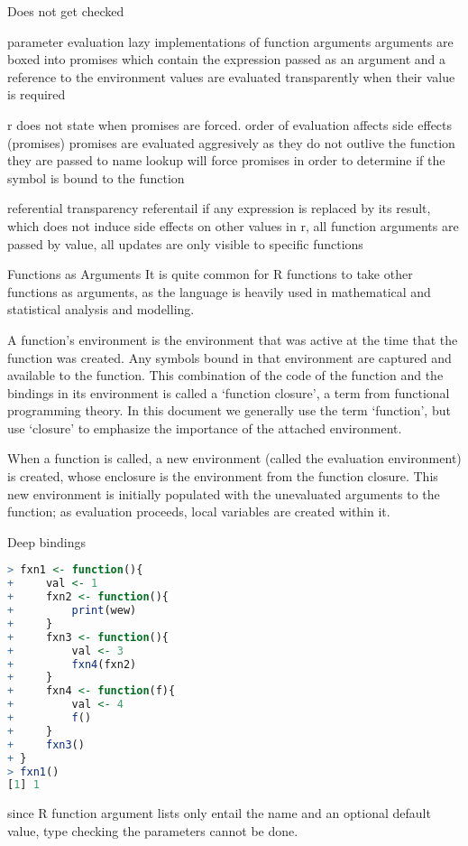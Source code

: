 \documentclass[12pt]{article}
\begin{document}
Does not get  checked

parameter evaluation
lazy implementations of function arguments
arguments are boxed into promises which contain the expression passed as an argument and a reference to the environment
values are evaluated transparently when their value is required

r does not state when promises are forced.
order of evaluation affects side effects (promises)
promises are evaluated aggresively as they do not outlive the function they are passed to
name lookup will force promises in order to determine if the symbol is bound to the function

referential transparency
referentail if any expression is replaced by its result, which does not induce side effects on other values
in r, all function arguments are passed by value, all updates are only visible to specific functions

Functions as Arguments
It is quite common for R functions to take other functions as arguments, as the language is heavily used in mathematical and statistical analysis and modelling.

A function’s environment is the environment that was active at the time that the function was
created. Any symbols bound in that environment are captured and available to the function. This
combination of the code of the function and the bindings in its environment is called a ‘function
closure’, a term from functional programming theory. In this document we generally use the
term ‘function’, but use ‘closure’ to emphasize the importance of the attached environment.

When a function is called, a new environment (called the evaluation environment) is created,
whose enclosure is the environment from the function closure. This new environment is initially populated with the unevaluated arguments to the function; as evaluation proceeds, local variables are created within it.

Deep bindings

\begin{lstlisting}[language=R]
> fxn1 <- function(){
+     val <- 1
+     fxn2 <- function(){
+         print(wew)
+     }
+     fxn3 <- function(){
+         val <- 3
+         fxn4(fxn2)
+     }
+     fxn4 <- function(f){
+         val <- 4
+         f()
+     }
+     fxn3()
+ }
> fxn1()
[1] 1
\end{lstlisting}

since R function argument lists only entail the name and an optional default value, type checking the parameters cannot be done.
\end{document}
